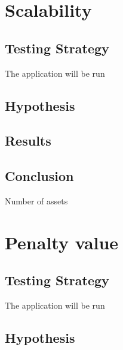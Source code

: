 \documentclass{pdfmx4020}
\begin{document}

  \section{Scalability} %
  \label{sec:scalability}

    \subsection{Testing Strategy} %
    \label{sub:testing_strategy}
      The application will be run


    \subsection{Hypothesis} %
    \label{sub:hypothesis}
      

    \subsection{Results} %
    \label{sub:results}
      

    \subsection{Conclusion} %
    \label{sub:conclusion}
      

    Number of assets

  \section{Penalty value} %
  \label{sec:penalty_value}

    \subsection{Testing Strategy}
      The application will be run

    \subsection{Hypothesis}
\end{document}
